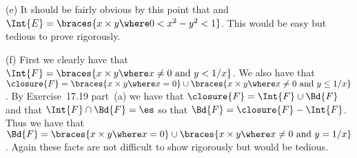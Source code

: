 {  (e) It should be fairly obvious by this point that
  and $\Int{E} = \braces{x \times y \where 0 < x^2 - y^2 < 1}$.
  This would be easy but tedious to prove rigorously.

  (f) First we clearly have that $\Int{F} = \braces{x \times y \where x \neq 0 \text{ and } y < 1/x}$.
  We also have that $\closure{F} = \braces{x \times y \where x = 0} \cup \braces{x \times y \where x \neq 0 \text{ and } y \leq 1/x}$.
  By Exercise~17.19 part~(a) we have that $\closure{F} = \Int{F} \cup \Bd{F}$ and that $\Int{F} \cap \Bd{F} = \es$ so that $\Bd{F} = \closure{F} - \Int{F}$.
  Thus we have that $\Bd{F} = \braces{x \times y \where x = 0} \cup \braces{x \times y \where x \neq 0 \text{ and } y = 1/x}$.
  Again these facts are not difficult to show rigorously but would be tedious.
}

